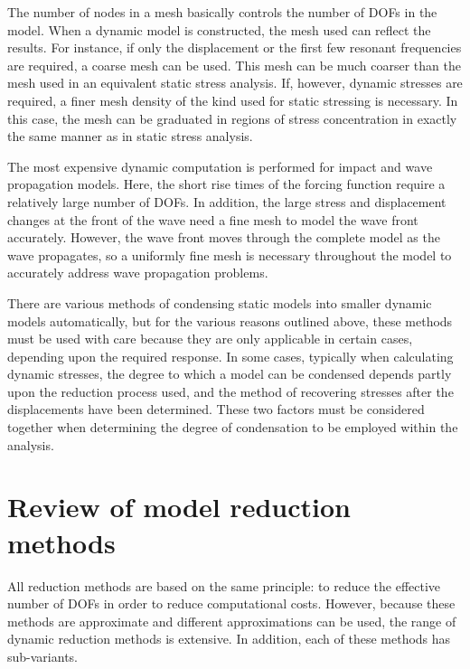 The number of nodes in a mesh basically controls the number of DOFs in the model. When a dynamic
model is constructed, the mesh used can reflect the results. For instance, if only the displacement
or the first few resonant frequencies are required, a coarse mesh can be used. This mesh can
be much coarser than the mesh used in an equivalent static stress analysis. If, however, dynamic
stresses are required, a finer mesh density of the kind used for static stressing is necessary.
In this case, the mesh can be graduated in regions of stress concentration in exactly the same
manner as in static stress analysis.

The most expensive dynamic computation is performed for impact and wave propagation models.
Here, the short rise times of the forcing function require a relatively large number of DOFs.
In addition, the large stress and displacement changes at the front of the wave need a fine
mesh to model the wave front accurately. However, the wave front moves through the complete
model as the wave propagates, so a uniformly fine mesh is necessary throughout the model to
accurately address wave propagation problems.

There are various methods of condensing static models into smaller dynamic models automatically,
but for the various reasons outlined above, these methods must be used with care because they
are only applicable in certain cases, depending upon the required response. In some cases,
typically when calculating dynamic stresses, the degree to which a model can be condensed depends
partly upon the reduction process used, and the method of recovering stresses after the displacements
have been determined. These two factors must be considered together when determining the degree
of condensation to be employed within the analysis.

\section{Review of model reduction methods}

All reduction methods are based on the same principle: to reduce the effective number of DOFs
in order to reduce computational costs. However, because these methods are approximate and
different approximations can be used, the range of dynamic reduction methods is extensive.
In addition, each of these methods has sub-variants.

